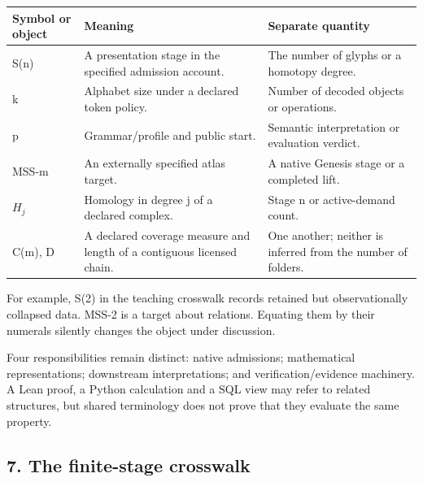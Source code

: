 \documentclass[
  11pt,
]{article}
\begin{document}
\begin{longtable}[]{@{}
  >{\raggedright\arraybackslash}p{}
  >{\raggedright\arraybackslash}p{}
  >{\raggedright\arraybackslash}p{}@{}}
\toprule\noalign{}
\begin{minipage}[b]{\linewidth}\raggedright
Symbol or object
\end{minipage} & \begin{minipage}[b]{\linewidth}\raggedright
Meaning
\end{minipage} & \begin{minipage}[b]{\linewidth}\raggedright
Separate quantity
\end{minipage} \\
\midrule\noalign{}
\endhead
\bottomrule\noalign{}
\endlastfoot
S(n) & A presentation stage in the specified admission account. & The
number of glyphs or a homotopy degree. \\
k & Alphabet size under a declared token policy. & Number of decoded
objects or operations. \\
p & Grammar/profile and public start. & Semantic interpretation or
evaluation verdict. \\
MSS-m & An externally specified atlas target. & A native Genesis stage
or a completed lift. \\
\(H_j\) & Homology in degree j of a declared complex. & Stage n or
active-demand count. \\
C(m), D & A declared coverage measure and length of a contiguous
licensed chain. & One another; neither is inferred from the number of
folders. \\
\end{longtable}

For example, S(2) in the teaching crosswalk records retained but
observationally collapsed data. MSS-2 is a target about relations.
Equating them by their numerals silently changes the object under
discussion.

Four responsibilities remain distinct: native admissions; mathematical
representations; downstream interpretations; and verification/evidence
machinery. A Lean proof, a Python calculation and a SQL view may refer
to related structures, but shared terminology does not prove that they
evaluate the same property.

\Needspace{430pt}
\subsection{7. The finite-stage
crosswalk}\label{the-finite-stage-crosswalk}
\end{document}
